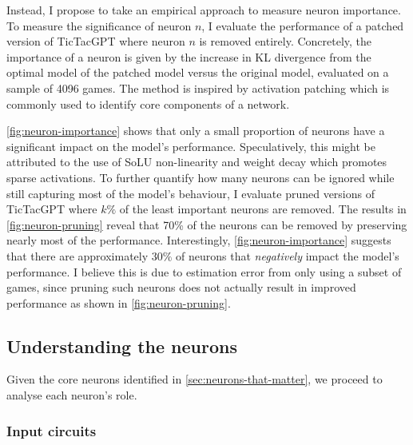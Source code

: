 \documentclass{article}
\newcommand{\ttgpt}{TicTacGPT\xspace}
\begin{document}
Instead, I propose to take an empirical approach to measure neuron importance. To measure the significance of neuron $n$, I evaluate the performance of a patched version of \ttgpt where neuron $n$ is removed entirely. Concretely, the importance of a neuron is given by the increase in KL divergence from the optimal model of the patched model versus the original model, evaluated on a sample of 4096 games. The method is inspired by activation patching \citep{meng2022locating,vig2020investigating} which is commonly used to identify core components of a network.

\cref{fig:neuron-importance} shows that only a small proportion of neurons have a significant impact on the model's performance. Speculatively, this might be attributed to the use of SoLU non-linearity and weight decay which promotes sparse activations. To further quantify how many neurons can be ignored while still capturing most of the model's behaviour, I evaluate pruned versions of \ttgpt where $k\%$ of the least important neurons are removed. The results in \cref{fig:neuron-pruning} reveal that 70\% of the neurons can be removed by preserving nearly most of the performance. Interestingly, \cref{fig:neuron-importance} suggests that there are
approximately $30\%$ of neurons that \emph{negatively} impact the model's performance. I believe this is due to estimation error from only using a subset of games, since pruning such neurons does not actually result in improved performance as shown in \cref{fig:neuron-pruning}.

\subsection{Understanding the neurons} \label{sec:neurons-visualisation}

Given the core neurons identified in \cref{sec:neurons-that-matter}, we proceed to analyse each neuron's role.

\subsubsection{Input circuits}
\end{document}

